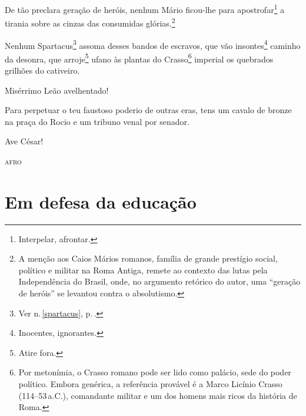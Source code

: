 De tão preclara geração de heróis, nenhum Mário ficou-lhe para
apostrofar\footnote{Interpelar, afrontar.} a tirania sobre as cinzas
das consumidas glórias.\footnote{A menção aos Caios Mários romanos,
  família de grande prestígio social, político e militar na Roma Antiga,
  remete ao contexto das lutas pela Independência do Brasil, onde, no
  argumento retórico do autor, uma ``geração de heróis'' se levantou
  contra o absolutismo.}

Nenhum Spartacus\footnote{Ver n.\,\ref{spartacus}, p.\,\pageref{spartacus}.} assoma desses bandos de escravos, que vão
insontes\footnote{Inocentes, ignorantes.} caminho da desonra, que
arroje\footnote{Atire fora.} ufano às plantas do Crasso\footnote{Por
  metonímia, o Crasso romano pode ser lido como palácio, sede do poder
  político. Embora genérica, a referência provável é a Marco Licínio
  Crasso (114--53\,a.C.), comandante militar e um dos homens mais ricos da
  história de Roma.} imperial os quebrados grilhões do cativeiro.

Misérrimo Leão avelhentado!

Para perpetuar o teu faustoso poderio de outras eras, tens um cavalo de
bronze na praça do Rocio e um tribuno venal por senador.

Ave César!

\begin{flushright}
\textsc{afro}
\end{flushright}

\part{Em defesa da educação} %


